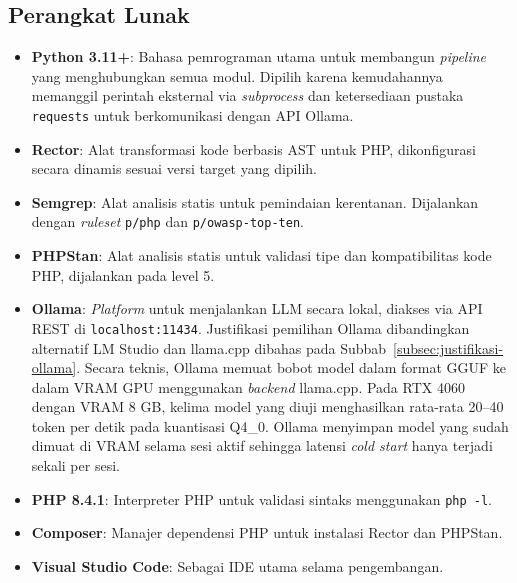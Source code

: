\subsection{Perangkat Lunak}

\begin{itemize}

    \item \textbf{Python 3.11+}: Bahasa pemrograman utama untuk 
    membangun \textit{pipeline} yang menghubungkan semua modul. 
    Dipilih karena kemudahannya memanggil perintah eksternal via 
    \textit{subprocess} dan ketersediaan pustaka \texttt{requests} 
    untuk berkomunikasi dengan API Ollama.

    \item \textbf{Rector}: Alat transformasi kode berbasis AST 
    untuk PHP, dikonfigurasi secara dinamis sesuai versi target 
    yang dipilih.

    \item \textbf{Semgrep}: Alat analisis statis untuk pemindaian 
    kerentanan. Dijalankan dengan \textit{ruleset} \texttt{p/php} 
    dan \texttt{p/owasp-top-ten}.

    \item \textbf{PHPStan}: Alat analisis statis untuk validasi 
    tipe dan kompatibilitas kode PHP, dijalankan pada level 5.

    \item \textbf{Ollama}: \textit{Platform} untuk menjalankan LLM 
    secara lokal, diakses via API REST di \texttt{localhost:11434}. 
    Justifikasi pemilihan Ollama dibandingkan alternatif LM Studio 
    dan llama.cpp dibahas pada Subbab~\ref{subsec:justifikasi-ollama}. 
    Secara teknis, Ollama memuat bobot model dalam format GGUF ke dalam VRAM GPU 
    menggunakan \textit{backend} llama.cpp. Pada RTX 4060 dengan 
    VRAM 8 GB, kelima model yang diuji menghasilkan rata-rata 
    20--40 token per detik pada kuantisasi Q4\_0. Ollama menyimpan 
    model yang sudah dimuat di VRAM selama sesi aktif sehingga 
    latensi \textit{cold start} hanya terjadi sekali per sesi.

    \item \textbf{PHP 8.4.1}: Interpreter PHP untuk validasi 
    sintaks menggunakan \texttt{php -l}.

    \item \textbf{Composer}: Manajer dependensi PHP untuk 
    instalasi Rector dan PHPStan.

    \item \textbf{Visual Studio Code}: Sebagai IDE utama selama pengembangan.

\end{itemize}
